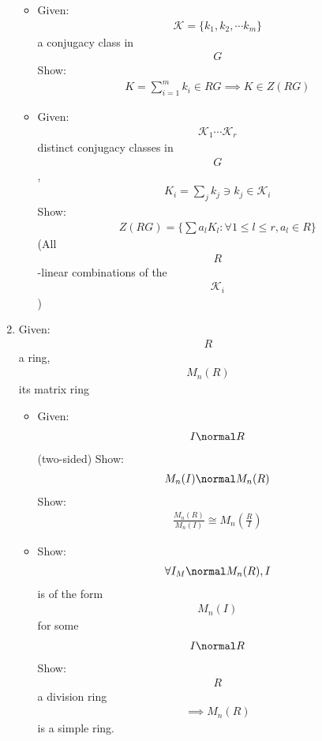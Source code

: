 \begin{enumerate}
  \begin{itemize}
  \tightlist
  \item
    Given:
    \begin{align*}\mathcal{K} = \{ k_1, k_2, \cdots k_m\}\end{align*} a
    conjugacy class in \begin{align*}G\end{align*} Show:
    \begin{align*}K = \sum_{i=1}^m k_i \in RG \implies K \in Z(RG)\end{align*}
  \item
    Given: \begin{align*}\mathcal{K}_1\cdots \mathcal{K}_r\end{align*}
    distinct conjugacy classes in \begin{align*}G\end{align*},
    \begin{align*}K_i = \sum_{j}k_j \ni k_j \in \mathcal{K}_i\end{align*}
    Show:
    \begin{align*}Z(RG) = \{\sum a_l K_l : \forall 1 \leq l \leq r, a_l \in R \}\end{align*}
    (All \begin{align*}R\end{align*}-linear combinations of the
    \begin{align*}\mathcal{K}_i\end{align*})
  \end{itemize}
\item
  Given: \begin{align*}R\end{align*} a ring,
  \begin{align*}M_n(R)\end{align*} its matrix ring

  \begin{itemize}
  \tightlist
  \item
    Given: \begin{align*}I \normal R\end{align*} (two-sided) Show:
    \begin{align*}M_n(I) \normal M_n(R)\end{align*} Show:
    \begin{align*}\frac{M_n(R)}{M_n(I)} \cong M_n(\frac{R}{I})\end{align*}
  \item
    Show: \begin{align*}\forall I_M \normal M_n(R), I\end{align*} is of
    the form \begin{align*}M_n(I)\end{align*} for some
    \begin{align*}I \normal R\end{align*} Show:
    \begin{align*}R\end{align*} a division ring
    \begin{align*}\implies M_n(R)\end{align*} is a simple ring.
  \end{itemize}
\end{enumerate}

